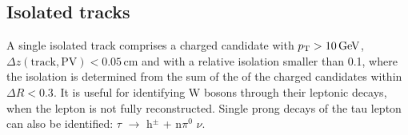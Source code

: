 %


\subsection{Isolated tracks}
\label{sec:SIT}

A single isolated track comprises a charged \PF candidate with ${p_{\text T}} >
10 \mathrm{\,Ge\kern -0.1em V}$,\\ $\Delta z(\mathrm{track}, \mathrm{PV}) < 0.05 \,
\mathrm{cm}$ and with a relative isolation smaller than 0.1, where the
isolation is determined from the sum of the \Pt of the charged \PF
candidates within $\Delta R < 0.3$. It is useful for identifying W
bosons through their leptonic decays, when the lepton is not fully
reconstructed.%
Single prong decays of
the tau lepton can also be identified: $\tau$
$\rightarrow$ h$^{\pm}$ + n$\pi^{0}$ $\nu$. 

